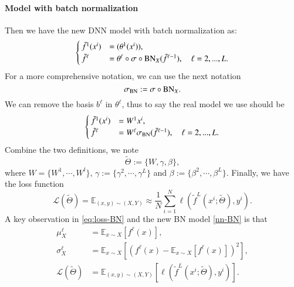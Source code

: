 \paragraph{Model with batch normalization}
Then we have the new DNN model with batch normalization as:
\begin{equation}\label{nn-BN0}
\begin{cases}
\tilde f^1(x^i)&= (\theta^1 (x^i) ),\\
\tilde f^\ell &= \theta^{\ell} \circ \sigma \circ {\rm BN}_{ X}(\tilde f^{\ell-1}), \quad  \ell=2,...,L.
\end{cases}
\end{equation}
For a more comprehensive notation, 
we can use the next notation
\begin{equation}
\sigma_{\rm BN} := \sigma \circ {\rm BN}_{ X}.
\end{equation}
We can remove the basis $b^\ell$ in $\theta^\ell$, thus to say the real model we use should be
\begin{equation}\label{nn-BN}
\begin{cases}
\tilde f^1(x^i)&= W^1 x^i ,\\
\tilde f^\ell &= W^{\ell}  \sigma_{\rm BN}(\tilde f^{\ell-1}), \quad  \ell=2,...,L.
\end{cases}
\end{equation}
Combine the two definitions, we note
\begin{equation}
\tilde \Theta := \{W, \gamma, \beta\},
\end{equation}
where
$W = \{W^1, \cdots, W^l \}$, $\gamma := \{\gamma^2, \cdots, \gamma^L\}$ and $\beta := \{\beta^2, \cdots, \beta^L\}$. 
Finally, we have the loss function  
\begin{equation}\label{eq:loss-BN}
\mathcal L(\tilde \Theta) = \mathbb{E}_{(x,y)\sim (X,Y)} \approx \frac{1}{N}\sum_{i=1}^N \ell(\tilde f^L(x^i; \tilde \Theta), y^i).
\end{equation}
A key observation in \eqref{eq:loss-BN} and the new BN model \eqref{nn-BN} is that
\begin{equation}\label{eq:threeExpectation}
\begin{aligned}
\mu^\ell_{ X} 
&= \mathbb{E}_{x \sim X} [f^\ell(x)],\\
\sigma^\ell_{ X}
&=  \mathbb{E}_{x \sim X}  \left[(f^\ell(x)-\mathbb{E}_{x \sim X}[ f^\ell(x)])^2 \right], \\
\mathcal L(\tilde \Theta) 
&=  \mathbb{E}_{(x,y)\sim (X,Y)}  \left[\ell(\tilde f^L(x^i; \tilde \Theta), y^i) \right].
\end{aligned}
\end{equation}
